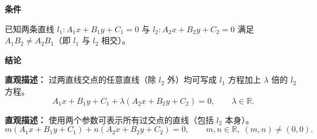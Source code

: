 \begin{statementbox}
	\textbf{\textcolor{CStatement}{条件}}
	\begin{description}[style=nextline, leftmargin=2.8em, labelsep=0.5em, itemsep=0.35em]
		\item[\textbf{\textcolor{CStatement}{条件1（两直线相交）：}}]
			已知两条直线 $l_1: A_1x+B_1y+C_1=0$ 与 $l_2: A_2x+B_2y+C_2=0$ 满足 $A_1B_2 \neq A_2B_1$（即 $l_1$ 与 $l_2$ 相交）。
	\end{description}
	\textbf{\textcolor{CStatement}{结论}}
	\begin{description}[style=nextline, leftmargin=2.8em, labelsep=0.5em, itemsep=0.45em]
		\item[\textbf{\textcolor{CStatement}{结论一（单参数表达）：}}]
			\textbf{\textcolor{CStatement}{直观描述：}}
			过两直线交点的任意直线（除 $l_2$ 外）均可写成 $l_1$ 方程加上 $\lambda$ 倍的 $l_2$ 方程。
			\[
				A_1x+B_1y+C_1 + \lambda (A_2x+B_2y+C_2)=0,
				\qquad
				\lambda \in \mathbb{R}.
			\]
		\item[\textbf{\textcolor{CStatement}{推广结论（双参数形式）：}}]
			\textbf{\textcolor{CStatement}{直观描述：}}
			使用两个参数可表示所有过交点的直线（包括 $l_2$ 本身）。
			\[
				m(A_1x+B_1y+C_1) + n(A_2x+B_2y+C_2)=0,
				\qquad
				m,n\in\mathbb{R},\;(m,n)\neq(0,0).
			\]
	\end{description}

\end{statementbox}
